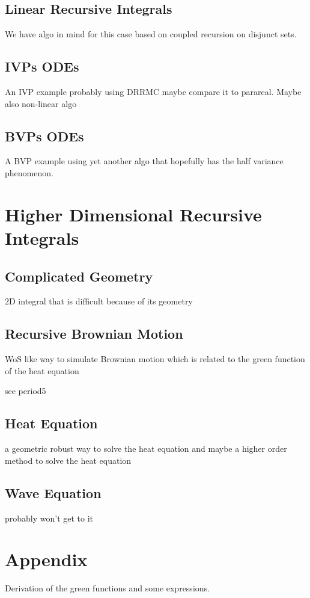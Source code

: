 \documentclass[a4paper,12pt,fleqn]{article}
\begin{document}
\subsection{Linear Recursive Integrals}
We have algo in mind for this case based on coupled recursion on disjunct sets.


\subsection{IVPs ODEs}
An IVP example probably using DRRMC maybe compare it to parareal. Maybe also non-linear algo

\subsection{BVPs ODEs}
A BVP example using yet another algo that hopefully has the half variance phenomenon.

\section{Higher Dimensional Recursive Integrals}
\subsection{Complicated Geometry}
\begin{example}
    $2$D integral that is difficult because of its geometry
\end{example}

\subsection{Recursive Brownian Motion}
WoS like way to simulate Brownian motion which is related to the green function
of the heat equation

\begin{example}
    see period5
\end{example}

\subsection{Heat Equation}
a geometric robust way to solve the heat equation and maybe a higher order method to solve
the heat equation

\subsection{Wave Equation}
probably won't get to it

\section{Appendix}
Derivation of the green functions and some expressions.
\end{document}
